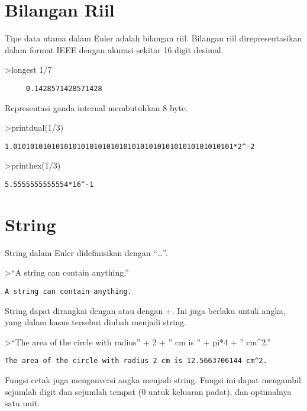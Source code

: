\documentclass[
]{book}
\begin{document}
\section{Bilangan Riil}\label{bilangan-riil}

Tipe data utama dalam Euler adalah bilangan riil. Bilangan riil direpresentasikan dalam format IEEE dengan akurasi sekitar 16 digit desimal.

\textgreater longest 1/7

\begin{verbatim}
     0.1428571428571428 
\end{verbatim}

Representasi ganda internal membutuhkan 8 byte.

\textgreater printdual(1/3)

\begin{verbatim}
1.0101010101010101010101010101010101010101010101010101*2^-2
\end{verbatim}

\textgreater printhex(1/3)

\begin{verbatim}
5.5555555555554*16^-1
\end{verbatim}

\section{String}\label{string}

String dalam Euler didefinisikan dengan ``\ldots{}''.

\textgreater{}``A string can contain anything.''

\begin{verbatim}
A string can contain anything.
\end{verbatim}

String dapat dirangkai dengan \textbar{} atau dengan +. Ini juga berlaku untuk angka, yang dalam kasus tersebut diubah menjadi string.

\textgreater{}``The area of the circle with radius'' + 2 + '' cm is '' + pi*4 + '' cm\^{}2.''

\begin{verbatim}
The area of the circle with radius 2 cm is 12.5663706144 cm^2.
\end{verbatim}

Fungsi cetak juga mengonversi angka menjadi string. Fungsi ini dapat mengambil sejumlah digit dan sejumlah tempat (0 untuk keluaran padat), dan optimalnya satu unit.
\end{document}
